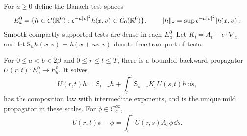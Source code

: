 For $a\ge0$ define the Banach test spaces
\begin{equation}\label{eq:target-test-spaces}
 E_a^0=\{h\in C(\mathbb R^6):e^{-a|v|^2}h(x,v)\in C_0(\mathbb R^6)\},
 \qquad \|h\|_a=\sup e^{-a|v|^2}|h(x,v)|.
\end{equation}
Smooth compactly supported tests are dense in each $E_a^0$.
Let $K_t=A_t-v\cdot\nabla_x$ and let
$\mathsf S_u h(x,v)=h(x+uv,v)$ denote free transport of tests.

\begin{lemma}\label{lem:target-propagator}
For $0\le a<b<2\beta$ and $0\le r\le t\le T$, there is a bounded
backward propagator $U(r,t):E_a^0\to E_b^0$.  It solves
\begin{equation}\label{eq:target-backward-mild}
 U(r,t)h=\mathsf S_{t-r}h
   +\int_r^t\mathsf S_{s-r}K_sU(s,t)h\,\dd s,
\end{equation}
has the composition law with intermediate exponents, and is the
unique mild propagator in these scales.  For $\phi\in C_c^\infty$,
\begin{equation}\label{eq:target-upper-end-identity}
 U(r,t)\phi-\phi=\int_r^t U(r,s)A_s\phi\,\dd s.
\end{equation}
\end{lemma}

